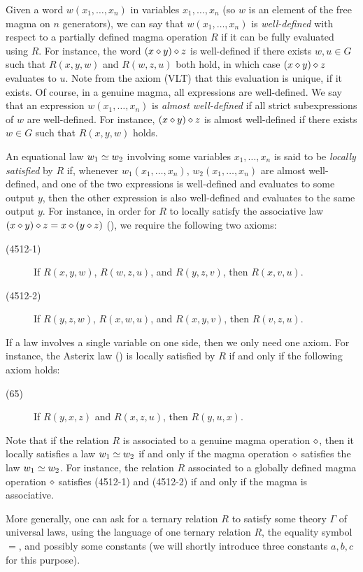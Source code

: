 Given a word $w(x_1,\dots,x_n)$ in variables $x_1,\dots,x_n$ (so $w$ is an element of the free magma on $n$ generators), we can say that $w(x_1,\dots,x_n)$ is \emph{well-defined} with respect to a partially defined magma operation $R$ if it can be fully evaluated using $R$.  For instance, the word $(x \diamond y) \diamond z$ is well-defined if there exists $w,u \in G$ such that $R(x,y,w)$ and $R(w,z,u)$ both hold, in which case $(x \diamond y) \diamond z$ evaluates to $u$.  Note from the axiom (VLT) that this evaluation is unique, if it exists.  Of course, in a genuine magma, all expressions are well-defined.  We say that an expression $w(x_1,\dots,x_n)$ is \emph{almost well-defined} if all strict subexpressions of $w$ are well-defined.  For instance, $(x \diamond y) \diamond z$ is almost well-defined if there exists $w \in G$ such that $R(x,y,w)$ holds.

An equational law $w_1 \simeq w_2$ involving some variables $x_1,\dots,x_n$ is said to be \emph{locally satisfied} by $R$ if,  whenever $w_1(x_1,\dots,x_n)$, $w_2(x_1,\dots,x_n)$ are almost well-defined, and one of the two expressions is well-defined and evaluates to some output $y$, then the other expression is also well-defined and evaluates to the same output $y$.  For instance, in order for $R$ to locally satisfy the associative law $(x \diamond y) \diamond z = x \diamond (y \diamond z)$ (), we require the following two axioms:
\begin{description}
  \item[(4512-1)] If $R(x,y,w)$, $R(w,z,u)$, and $R(y,z,v)$, then $R(x,v,u)$.
  \item[(4512-2)] If $R(y,z,w)$, $R(x,w,u)$, and $R(x,y,v)$, then $R(v,z,u)$.
\end{description}
If a law involves a single variable on one side, then we only need one axiom.  For instance, the Asterix law () is locally satisfied by $R$ if and only if the following axiom holds:
\begin{description}
  \item[(65)] If $R(y,x,z)$ and $R(x,z,u)$, then $R(y,u,x)$.
\end{description}
Note that if the relation $R$ is associated to a genuine magma operation $\diamond$, then it locally satisfies a law $w_1 \simeq w_2$ if and only if the magma operation $\diamond$ satisfies the law $w_1 \simeq w_2$.  For instance, the relation $R$ associated to a globally defined magma operation $\diamond$ satisfies (4512-1) and (4512-2) if and only if the magma is associative.

More generally, one can ask for a ternary relation $R$ to satisfy some theory $\Gamma$ of universal laws, using the language of one ternary relation $R$, the equality symbol $=$, and possibly some constants (we will shortly introduce three constants $a,b,c$ for this purpose).

